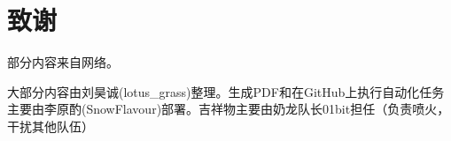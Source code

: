 \newpage
\chapter{致谢}
部分内容来自网络。

大部分内容由刘昊诚(lotus\_grass)整理。生成PDF和在GitHub上执行自动化任务主要由李原酌(SnowFlavour)部署。吉祥物主要由奶龙队长01bit担任（负责喷火，干扰其他队伍）